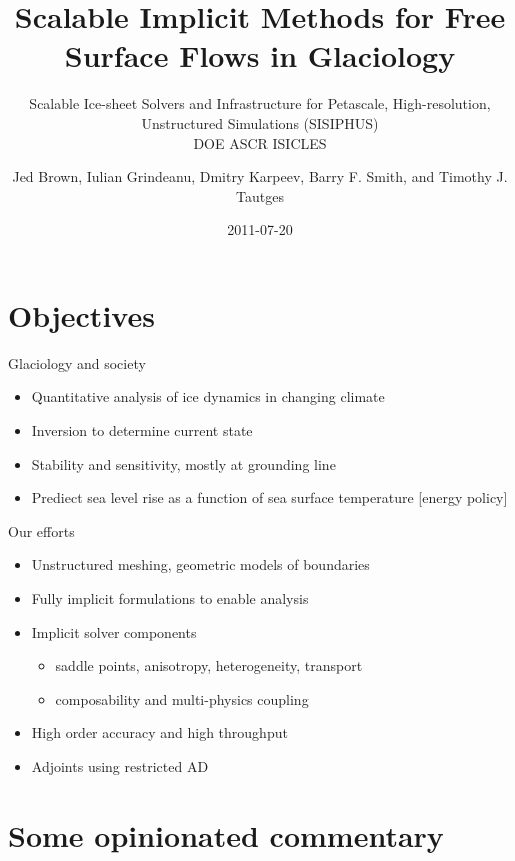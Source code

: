 \documentclass{beamer}
\title{Scalable Implicit Methods for Free Surface Flows in Glaciology}
\subtitle{Scalable Ice-sheet Solvers and Infrastructure for Petascale, High-resolution, Unstructured Simulations (SISIPHUS) \\
DOE ASCR ISICLES}
\author{Jed Brown\inst{1,2}, Iulian Grindeanu\inst{1}, Dmitry Karpeev\inst{1}, Barry F. Smith\inst{1}, and Timothy J. Tautges\inst{1}}
\institute
{
  \inst{1}{Argonne National Laboratory} \\
  \inst{2}{ETH Z\"urich}
}
\date{2011-07-20}
\begin{document}
\lstset{language=C}
\normalem

\begin{frame}
\titlepage
\end{frame}

\section{Objectives}

\begin{frame}
  \begin{block}{Glaciology and society}
    \begin{itemize}
    \item Quantitative analysis of ice dynamics in changing climate
    \item Inversion to determine current state
    \item Stability and sensitivity, mostly at grounding line
    \item Prediect sea level rise as a function of sea surface temperature [energy policy]
    \end{itemize}
  \end{block}
  \begin{block}{Our efforts}
    \begin{itemize}
    \item Unstructured meshing, geometric models of boundaries
    \item Fully implicit formulations to enable analysis
    \item Implicit solver components
      \begin{itemize}
      \item saddle points, anisotropy, heterogeneity, transport
      \item composability and multi-physics coupling
      \end{itemize}
    \item High order accuracy and high throughput
    \item Adjoints using restricted AD
    \end{itemize}
  \end{block}
\end{frame}

\section{Some opinionated commentary}


\end{document}
